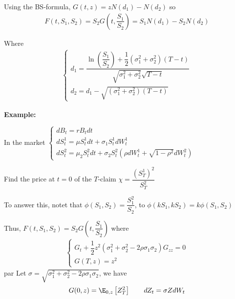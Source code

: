 \noindent Using the BS-formula,  $G(t,z) = zN(d_1)-N(d_2)$ so
\begin{equation*}
  \begin{gathered}
    F(t,S_1,S_2) = S_2G\left(t,\dfrac{S_1}{S_2}\right) = S_1N(d_1)-S_2N(d_2)
  \end{gathered}
\end{equation*}\par
\noindent Where
\begin{equation*}
  \begin{gathered}
    \begin{cases}
      d_1 = \dfrac{\ln{\left(\dfrac{S_1}{S_2}\right)}+\dfrac{1}{2}(\sigma_1^2+\sigma_2^2)(T-t)}{\sqrt{\sigma_1^2+\sigma_2^2}\sqrt{T-t}}\\
      d_2 = d_1-\sqrt{(\sigma_1^2+\sigma_2^2)(T-t)}
    \end{cases}
  \end{gathered}
\end{equation*}
\par\bigskip
\noindent\textbf{Example:}\par
\noindent In the market $\begin{cases}
  dB_t = rB_tdt\\
  dS_t^1=\mu S_t^1dt+\sigma_1S_t^1dW_t^1\\
  dS_t^2=\mu_2S_t^2dt+\sigma_2S_t^2\left(\rho dW_t^1+\sqrt{1-\rho^2}dW_t^2\right)
\end{cases}$\par
\noindent Find the price at $t=0$ of the $T$-claim $\chi = \dfrac{(S_T^1)^2}{S_T^2}$
\par\bigskip
\noindent To answer this, notet that $\phi(S_1,S_2) = \dfrac{S_1^2}{S_2}$, to $\phi(kS_1,kS_2) = k\phi(S_1,S_2)$\par
\noindent Thus, $F(t,S_1,S_2) = S_2G\left(t,\dfrac{S_1}{S_2}\right)$ where
\begin{equation*}
  \begin{gathered}
    \begin{cases}
      G_t+\dfrac{1}{2}z^2\left(\sigma_1^2+\sigma_2^2-2\rho\sigma_1\sigma_2\right)G_{zz} = 0\\
      G(T,z) = z^2
    \end{cases}
  \end{gathered}
\end{equation*}par
\noindent Let $\sigma = \sqrt{\sigma_1^2+\sigma_2^2-2\rho\sigma_1\sigma_2}$, we have
\begin{equation*}
  \begin{gathered}
    G(0,z) = \E_{0,z}\left[Z_T^2\right]\qquad dZ_t = \sigma ZdW_t
  \end{gathered}
\end{equation*}\par

